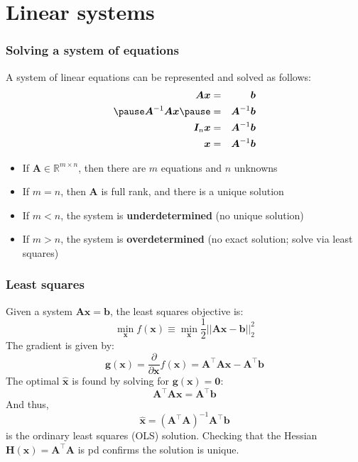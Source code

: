 \documentclass[smaller]{beamer}
\newcommand{\?}{\stackrel{?}{=}}
\newcommand{\fr}{\frac}
\newcommand{\mb}{\mathbb}
\newcommand{\tr}{^{\top}}
\begin{document}
\section{Linear systems}
\begin{frame}
  \frametitle{Solving a system of equations}
  \pause
  A system of linear equations can be represented and solved as
  follows: \pause
  \begin{eqnarray*}
    \bm{Ax} &=& \bm b \\\pause
    \bm{A}^{-1}\bm{Ax} \pause &=& \bm A^{-1}  \bm b \\
    \bm I_{n}\bm x &=& \bm A^{-1}\bm b \\
    \bm x &=& \bm{A}^{-1}\bm b
  \end{eqnarray*}
\pause
\begin{itemize}
\item  If $\bm A\in\mb{R}^{m\times n}$, then there are $m$ equations
  and $n$ unknowns \pause
\item If $m=n$, then $\bm A$ is full rank, and there is a unique
  solution \pause

\item If $m < n$, the system is \textbf{underdetermined} (no unique
  solution)

\item If $m>n$, the system is \textbf{overdetermined} (no exact
  solution; solve via least squares)
\end{itemize}
\end{frame}

\begin{frame}
  \frametitle{Least squares}
  \pause
  Given a system $\bm A\bm x = \bm b$, the least squares objective is:
  \pause
  \begin{equation}
    \min_{\bm x} f(\bm x) \equiv \min_{\bm x} \fr12||\bm A\bm x - \bm b||_2^2
  \end{equation}
  \pause
  The gradient is given by:\pause
  \begin{equation}
    \bm g(\bm x) = \fr{\partial}{\partial \bm x} f(\bm x) = \bm A\tr\bm A\bm x - \bm
    A\tr\bm b
  \end{equation}
  \pause
  The optimal $\bm {\hat x}$ is found by solving for $\bm g(\bm x) =
  \bm 0$: \pause
  \begin{equation}
     \bm{A}\tr\bm A\bm x = \bm  A\tr\bm b
  \end{equation}
  \pause
  And thus,
  \begin{equation}
    \hat{\bm x} = ( \bm A\tr\bm A)^{-1}\bm A\tr \bm b
  \end{equation}
  \pause 
  is the ordinary least squares (OLS) solution.
\pause
Checking that the Hessian $\bm H(\bm x) = \bm A\tr\bm A$ is pd
confirms the solution is unique.
\end{frame}
\end{document}
